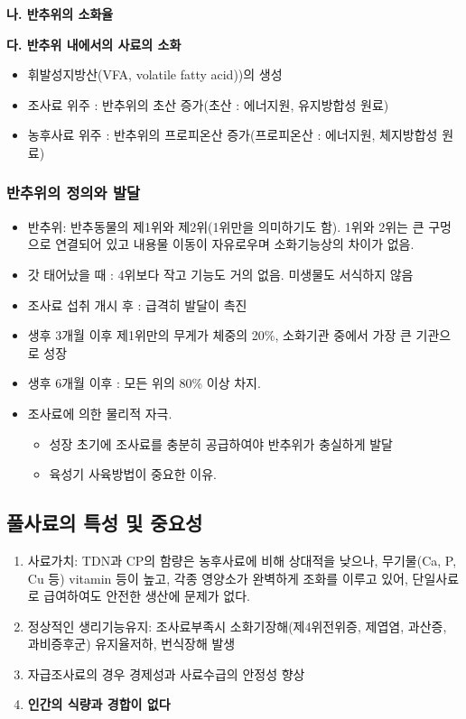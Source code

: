 \documentclass[]{book}
\providecommand{\tightlist}{%
  \setlength{\itemsep}{0pt}\setlength{\parskip}{0pt}}
\begin{document}
\textbf{나. 반추위의 소화율}

\textbf{다. 반추위 내에서의 사료의 소화}

\begin{itemize}
\tightlist
\item
  휘발성지방산(VFA, volatile fatty acid))의 생성\\
\item
  조사료 위주 : 반추위의 초산 증가(초산 : 에너지원, 유지방합성 원료)\\
\item
  농후사료 위주 : 반추위의 프로피온산 증가(프로피온산 : 에너지원,
  체지방합성 원료)
\end{itemize}

\subsubsection{반추위의 정의와 발달}\label{--}

\begin{itemize}
\tightlist
\item
  반추위: 반추동물의 제1위와 제2위(1위만을 의미하기도 함). 1위와 2위는
  큰 구멍으로 연결되어 있고 내용물 이동이 자유로우며 소화기능상의 차이가
  없음.
\item
  갓 태어났을 때 : 4위보다 작고 기능도 거의 없음. 미생물도 서식하지 않음
\item
  조사료 섭취 개시 후 : 급격히 발달이 촉진
\item
  생후 3개월 이후 제1위만의 무게가 체중의 20\%, 소화기관 중에서 가장 큰
  기관으로 성장
\item
  생후 6개월 이후 : 모든 위의 80\% 이상 차지.\\
\item
  조사료에 의한 물리적 자극.

  \begin{itemize}
  \tightlist
  \item
    성장 초기에 조사료를 충분히 공급하여야 반추위가 충실하게 발달
  \item
    육성기 사육방법이 중요한 이유.
  \end{itemize}
\end{itemize}

\subsection{풀사료의 특성 및 중요성}\label{---}

\begin{enumerate}
\def\labelenumi{\arabic{enumi}.}
\item
  사료가치: TDN과 CP의 함량은 농후사료에 비해 상대적을 낮으나,
  무기물(Ca, P, Cu 등) vitamin 등이 높고, 각종 영양소가 완벽하게 조화를
  이루고 있어, 단일사료로 급여하여도 안전한 생산에 문제가 없다.
\item
  정상적인 생리기능유지: 조사료부족시 소화기장해(제4위전위증, 제엽염,
  과산증, 과비증후군) 유지율저하, 번식장해 발생
\item
  자급조사료의 경우 경제성과 사료수급의 안정성 향상
\item
  \textbf{인간의 식량과 경합이 없다}
\end{enumerate}
\end{document}
